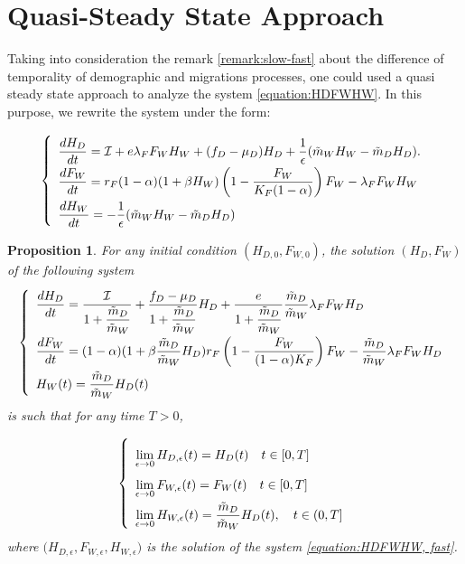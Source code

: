 \documentclass{article}
\newcommand{\lfw}{\lambda_{F}}
\newcommand{\lfw}{\lambda_{F}}
\newcommand{\cI}{\mathcal{I}}
\newcommand{\mW}{\tilde{m}_W}
\newcommand{\mD}{\tilde{m}_D}
\newtheorem{prop}{Proposition}
\begin{document}
\section{Quasi-Steady State Approach}

Taking into consideration the remark \ref{remark:slow-fast} about the difference of temporality of demographic and migrations processes, one could used a quasi steady state approach to analyze the system \eqref{equation:HDFWHW}. In this purpose, we rewrite the system under the form:

\begin{equation}
\def\arraystretch{2}
\left\{ 
\begin{array}{l}
\dfrac{dH_D}{dt}= \cI + e\lfw F_WH_W + (f_D - \mu_D) H_D + \dfrac{1}{\epsilon}(\mW H_W - \mD H_D). \\
\dfrac{dF_W}{dt} = r_F(1- \alpha) (1+ \beta H_W) \left(1 - \dfrac{F_W}{K_F(1-\alpha)} \right) F_W - \lfw F_WH_W \\
\dfrac{dH_W}{dt}= - \dfrac{1}{\epsilon}(\mW H_W - \mD H_D)
\end{array} \right.
\label{equation:HDFWHW, fast}
\end{equation}

\begin{prop}
For any initial condition $(H_{D,0}, F_{W, 0})$, the solution $(H_D, F_W)$  of the following system
\begin{equation}
\def\arraystretch{2}
\left\lbrace \begin{array}{l}
\dfrac{dH_D}{dt} = \dfrac{\cI}{1+ \dfrac{\mD}{\mW}} + \dfrac{f_D - \mu_D}{1+\dfrac{\mD}{\mW}} H_D + \dfrac{e}{1+\dfrac{\mD}{\mW}} \dfrac{\mD}{\mW} \lfw F_WH_D \\
\dfrac{dF_W}{dt} = (1-\alpha) (1+\beta \dfrac{\mD}{\mW} H_D) r_F \left(1 - \dfrac{F_W}{(1-\alpha)K_F} \right) F_W - \dfrac{\mD}{\mW} \lfw F_W H_D \\
H_W(t) = \dfrac{\mD}{\mW} H_D(t)
\end{array} \right.
\label{equation:HDFW}
\end{equation} is such that for any time $T > 0$, 

\begin{equation*}
\def\arraystretch{2}
\left\lbrace \begin{array}{l}
\lim\limits_{ \epsilon \rightarrow 0}{H_{D, \epsilon}(t)} = H_D(t) \quad t \in [0,T] \\
\lim\limits_{ \epsilon \rightarrow 0} F_{W,  \epsilon}(t) = F_W(t)\quad t \in [0,T] \\
 \lim\limits_{ \epsilon \rightarrow 0} H_{W,  \epsilon}(t) = \dfrac{\mD}{\mW} H_D(t), \quad  t\in (0,T] \\
\end{array} \right.
\end{equation*}
where $\Big(H_{D, \epsilon}, F_{W,  \epsilon}, H_{W,  \epsilon} \Big)$ is the solution of the system \eqref{equation:HDFWHW, fast}.

\end{prop}
\end{document}
